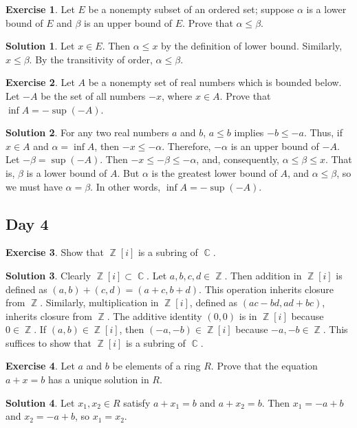 \documentclass{article}
\theoremstyle{definition}
\newtheorem{exercise}{Exercise}
\newtheorem*{solution}{Solution}
\DeclareMathOperator{\Z}{\mathbb{Z}}
\DeclareMathOperator{\C}{\mathbb{C}}
\begin{document}
\begin{exercise}
    Let \(E\) be a nonempty subset of an ordered set; suppose \(\alpha\) is a lower bound of \(E\) and \(\beta\) is an upper bound of \(E\). Prove that \(\alpha\leq\beta\).
\end{exercise}
\begin{solution}
    Let \(x\in E\). Then \(\alpha\leq x\) by the definition of lower bound. Similarly, \(x\leq\beta\). By the transitivity of order, \(\alpha\leq\beta\).
\end{solution}

\begin{exercise}
    Let \(A\) be a nonempty set of real numbers which is bounded below. Let \(-A\) be the set of all numbers \(-x\), where \(x\in A\). Prove that \(\inf A=-\sup(-A)\).
\end{exercise}
\begin{solution}
    For any two real numbers \(a\) and \(b\), \(a\leq b\) implies \(-b\leq -a\). Thus, if \(x\in A\) and \(\alpha=\inf A\), then \(-x\leq-\alpha\). Therefore, \(-\alpha\) is an upper bound of \(-A\). Let \(-\beta=\sup(-A)\). Then \(-x\leq-\beta\leq-\alpha\), and, consequently, \(\alpha\leq\beta\leq x\). That is, \(\beta\) is a lower bound of \(A\). But \(\alpha\) is the greatest lower bound of \(A\), and \(\alpha\leq\beta\), so we must have \(\alpha=\beta\). In other words, \(\inf A=-\sup(-A)\).
\end{solution}

\subsection{Day 4}
\begin{exercise}
    Show that \(\Z[i]\) is a subring of \(\C\).
\end{exercise}
\begin{solution}
    Clearly \(\Z[i]\subset\C\). Let \(a,b,c,d\in\Z\). Then addition in \(\Z[i]\) is defined as \((a,b)+(c,d)=(a+c,b+d)\). This operation inherits closure from \(\Z\). Similarly, multiplication in \(\Z[i]\), defined as \((ac-bd,ad+bc)\), inherits closure from \(\Z\). The additive identity \((0,0)\) is in \(\Z[i]\) because \(0\in\Z\). If \((a,b)\in\Z[i]\), then \((-a,-b)\in\Z[i]\) because \(-a,-b\in\Z\). This suffices to show that \(\Z[i]\) is a subring of \(\C\).
\end{solution}

\begin{exercise}
    Let \(a\) and \(b\) be elements of a ring \(R\). Prove that the equation \(a+x=b\) has a unique solution in \(R\).
\end{exercise}
\begin{solution}
    Let \(x_1,x_2\in R\) satisfy \(a+x_1=b\) and \(a+x_2=b\). Then \(x_1=-a+b\) and \(x_2=-a+b\), so \(x_1=x_2\).
\end{solution}
\end{document}

